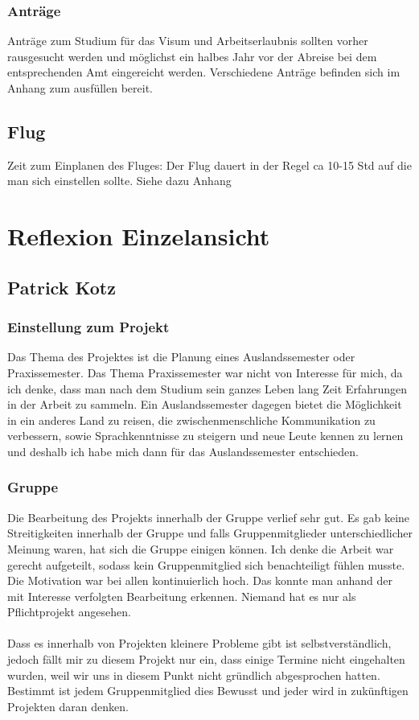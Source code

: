\documentclass[11pt]{article}
\begin{document}
\subsubsection{Anträge}
Anträge zum Studium für das Visum und Arbeitserlaubnis sollten vorher rausgesucht werden und möglichst ein halbes Jahr vor der Abreise bei dem entsprechenden Amt eingereicht werden. Verschiedene Anträge befinden sich im Anhang zum ausfüllen bereit.

\subsection{Flug}
Zeit zum Einplanen des Fluges: Der Flug dauert in der Regel ca 10-15 Std auf die man sich einstellen sollte.
Siehe dazu Anhang

\newpage

\section{Reflexion Einzelansicht}
\subsection{Patrick Kotz}
\subsubsection{Einstellung zum Projekt}

Das Thema des Projektes ist die Planung eines Auslandssemester oder Praxissemester. Das Thema Praxissemester war nicht von Interesse für mich, da ich denke, dass man nach dem Studium sein ganzes Leben lang Zeit Erfahrungen in der Arbeit zu sammeln. Ein Auslandssemester dagegen bietet die Möglichkeit in ein anderes Land zu reisen, die zwischenmenschliche  Kommunikation zu verbessern, sowie Sprachkenntnisse zu steigern und neue Leute kennen zu lernen und deshalb ich habe mich dann für das Auslandssemester entschieden. 



\subsubsection{Gruppe}

Die Bearbeitung des Projekts innerhalb der Gruppe verlief sehr gut. Es gab keine Streitigkeiten innerhalb der Gruppe und falls Gruppenmitglieder unterschiedlicher Meinung waren, hat sich die Gruppe einigen können. Ich denke die Arbeit war gerecht aufgeteilt, sodass kein Gruppenmitglied sich benachteiligt fühlen musste. Die Motivation war bei allen kontinuierlich hoch. Das konnte man anhand der mit Interesse verfolgten Bearbeitung erkennen. Niemand hat es nur als Pflichtprojekt angesehen.\\\\
Dass es innerhalb von Projekten kleinere Probleme gibt ist selbstverständlich, jedoch fällt mir zu diesem Projekt nur ein, dass einige Termine nicht eingehalten wurden, weil wir uns in diesem Punkt nicht gründlich abgesprochen hatten. Bestimmt ist jedem Gruppenmitglied dies Bewusst und jeder wird in zukünftigen Projekten daran denken.
\end{document}
